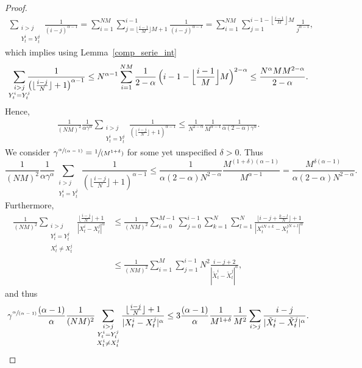 \documentclass[10pt]{amsart}
\newcommand{\spfrac}[2]{\sfrac{#1}{(#2)}}
\theoremstyle{plain}
\theoremstyle{definition}
\begin{document}
\begin{proof}
\begin{gather*}
\tag*{and}
\sum_{\substack{i>j\\Y^i_t= Y^j_t}}\frac{1}{(i-j)^{\alpha-1}}=\sum_{i=1}^{NM}\sum_{j=\lfloor\frac{i-1}{M}\rfloor M+1}^{i-1}\frac{1}{(i-j)^{\alpha-1}}=\sum_{i=1}^{NM}\sum_{j=1}^{i-1-\left\lfloor\frac{i-1}{M}\right\rfloor M}\frac{1}{j^{\alpha-1}},
\end{gather*}
which implies using Lemma~\ref{comp_serie_int}\vspace*{-3pt}
\[
\sum_{\substack{i>j\\Y^i_t= Y^j_t}}\hspace*{-2mm}\frac{1}{\left(\lfloor\frac{i-j}{N}\rfloor+1\right)^{\alpha-1}}\leq N^{\alpha-1}\sum_{i=1}^{NM}\frac{1}{2-\alpha}\,\Bigl(i-1-\Bigl\lfloor\frac{i-1}{M}\Bigr\rfloor M\Bigr)^{2-\alpha}\leq \frac{N^\alpha MM^{2-\alpha}}{2-\alpha}.
\]
Hence,\vspace*{-5pt}
\begin{align*}
\frac{1}{(NM)^2}\frac{1}{\alpha\gamma^\alpha}\sum_{\substack{i>j\\Y^i_t= Y^j_t}}\frac{1}{\left(\lfloor\frac{i-j}{N}\rfloor+1\right)^{\alpha-1}}\leq\frac{1}{N^{2-\alpha}}\frac{1}{M^{\alpha-1}}\frac{1}{\alpha(2-\alpha)\gamma^\alpha}.
\end{align*}
We consider $\gamma^{\spfrac{\alpha}{\alpha-1}}=\spfrac{1}{M^{1+\delta}}$ for some yet unspecified $\delta>0$. Thus\vspace*{-3pt}
\[
\frac{1}{(NM)^2}\frac{1}{\alpha\gamma^\alpha}\sum_{\substack{i>j\\Y^i_t= Y^j_t}}\frac{1}{\left(\lfloor\frac{i-j}{N}\rfloor+1\right)^{\alpha-1}}\leq\frac{1}{\alpha(2-\alpha) N^{2-\alpha}}\frac{M^{(1+\delta)(\alpha-1)}}{M^{\alpha-1}}=\frac{M^{\delta(\alpha-1)}}{\alpha(2-\alpha) N^{2-\alpha}}.
\]
Furthermore,
\begin{align*}
\frac{1}{(NM)^2}\sum_{\substack{i>j\\Y^i_t= Y^j_t\\X^i_t\neq X^j_t}}\frac{\lfloor\frac{i-j}{N}\rfloor+1}{|X^i_t-X^j_t|^{\alpha}}
&\leq \frac{1}{(NM)^2}\sum_{i=0}^{M-1}\sum_{j=0}^{i-1}\sum_{k=1}^N\sum_{l=1}^N\frac{\lfloor i-j+\frac{k-l}{N}\rfloor+1}{|X^{iN+k}_t-X^{jN+l}_t|^{\alpha}}\\[-15pt]
&\leq \frac{1}{(NM)^2}\sum_{i=1}^{M}\sum_{j=1}^{i-1}N^2\frac{i-j+2}{|\tilde{X}^{i}_t-\tilde{X}^{j}_t|^{\alpha}},
\end{align*}
and thus
\[
\gamma^{\spfrac{\alpha}{\alpha-1}}\frac{(\alpha-1)}{\alpha}\frac{1}{(NM)^2}\sum_{\substack{i>j\\Y^i_t= Y^j_t\\X^i_t\neq X^j_t}}\frac{\lfloor\frac{i-j}{N}\rfloor+1}{|X^i_t-X^j_t|^{\alpha}}\leq 3\frac{(\alpha-1)}{\alpha}\frac{1}{M^{1+\delta}}\frac{1}{M^2}\sum_{i>j}\frac{i-j}{|\tilde{X}^{i}_t-\tilde{X}^{j}_t|^{\alpha}}.
\]
\end{proof}
\end{document}
